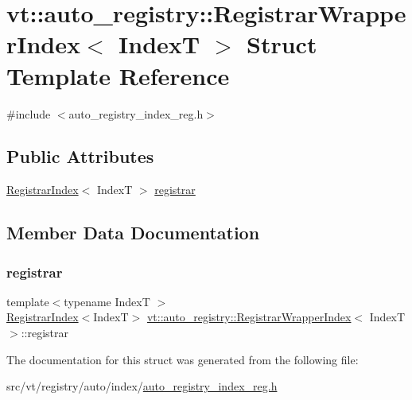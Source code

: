 \hypertarget{structvt_1_1auto__registry_1_1_registrar_wrapper_index}{}\section{vt\+:\+:auto\+\_\+registry\+:\+:Registrar\+Wrapper\+Index$<$ IndexT $>$ Struct Template Reference}
\label{structvt_1_1auto__registry_1_1_registrar_wrapper_index}


{\ttfamily \#include $<$auto\+\_\+registry\+\_\+index\+\_\+reg.\+h$>$}

\subsection*{Public Attributes}
\begin{DoxyCompactItemize}
\item 
\hyperlink{structvt_1_1auto__registry_1_1_registrar_index}{Registrar\+Index}$<$ IndexT $>$ \hyperlink{structvt_1_1auto__registry_1_1_registrar_wrapper_index_add44f571a89096032e8fc5e5ce54f248}{registrar}
\end{DoxyCompactItemize}


\subsection{Member Data Documentation}
\mbox{\label{structvt_1_1auto__registry_1_1_registrar_wrapper_index_add44f571a89096032e8fc5e5ce54f248}} 
\subsubsection{\texorpdfstring{registrar}{registrar}}
{\footnotesize\ttfamily template$<$typename IndexT $>$ \\
\hyperlink{structvt_1_1auto__registry_1_1_registrar_index}{Registrar\+Index}$<$IndexT$>$ \hyperlink{structvt_1_1auto__registry_1_1_registrar_wrapper_index}{vt\+::auto\+\_\+registry\+::\+Registrar\+Wrapper\+Index}$<$ IndexT $>$\+::registrar}



The documentation for this struct was generated from the following file\+:\begin{DoxyCompactItemize}
\item 
src/vt/registry/auto/index/\hyperlink{auto__registry__index__reg_8h}{auto\+\_\+registry\+\_\+index\+\_\+reg.\+h}\end{DoxyCompactItemize}
